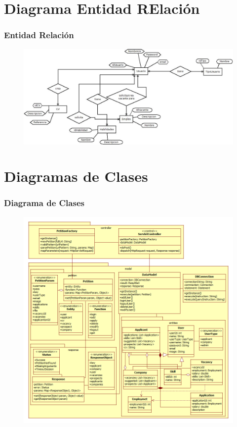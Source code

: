 \section{Diagrama Entidad RElación}
\frame
{
  \frametitle{Entidad Relación}
  
	\begin{figure}[h]
	\begin{center}
	 	\includegraphics[scale=0.30]{./resources/eer.jpg} 
	\end{center}
	\end{figure}
}

\section{Diagramas de Clases}
\frame
{
  \frametitle{Diagrama de Clases}
  
	\begin{figure}[h]
	\begin{center}
	 	\includegraphics[scale=0.30]{./resources/ClassDiagram.png} 
	\end{center}
	\end{figure}
}

